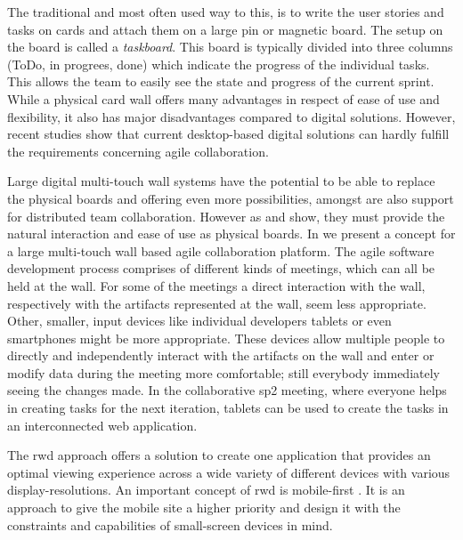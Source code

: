 \documentclass{sigchi}
\begin{document}
The traditional and most often used way to this, is to write the user stories and tasks on cards and attach them on a large pin or magnetic board.
The setup on the board is called a \textit{taskboard}. This board is typically divided into three columns (ToDo, in progrees, done) which indicate the progress of the individual tasks. This allows the team to easily see the state and progress of the current sprint. While a physical card wall offers many advantages in respect of ease of use and flexibility, it also has major disadvantages compared to digital solutions. However, recent studies \cite{udcw:31721, Mateescu:2015} show that current desktop-based digital solutions can hardly fulfill the requirements concerning agile collaboration.

Large digital multi-touch wall systems have the potential to be able to replace the physical boards and offering even more possibilities, amongst are also support for distributed team collaboration. However as \cite{udcw:31721} and \cite{Mateescu:2015} show, they must provide the natural interaction and ease of use as physical boards. 
In \cite{Mateescu:2015} we present a concept for a large multi-touch wall based agile collaboration platform. The agile software development process comprises of different kinds of meetings, which can all be held at the wall. For some of the meetings a direct interaction with the wall, respectively with the artifacts represented at the wall, seem less appropriate. Other, smaller, input devices like individual developers tablets or even smartphones might be more appropriate. These devices allow multiple people to directly and independently interact with the artifacts on the wall and enter or modify data during the meeting more comfortable; still everybody immediately seeing the changes made. 
In the collaborative \gls{sp2} meeting, where everyone helps in creating tasks for the next iteration, tablets can be used to create the tasks in an interconnected web application.

The \gls{rwd} \cite{Marcotte:2011} approach offers a solution to create one application that provides an optimal viewing experience across a wide variety of different devices with various display-resolutions. 
An important concept of \gls{rwd} is mobile-first \cite{Wroblewski:2011}. 
It is an approach to give the mobile site a higher priority and design it with the constraints and capabilities of small-screen devices in mind. 
\end{document}
